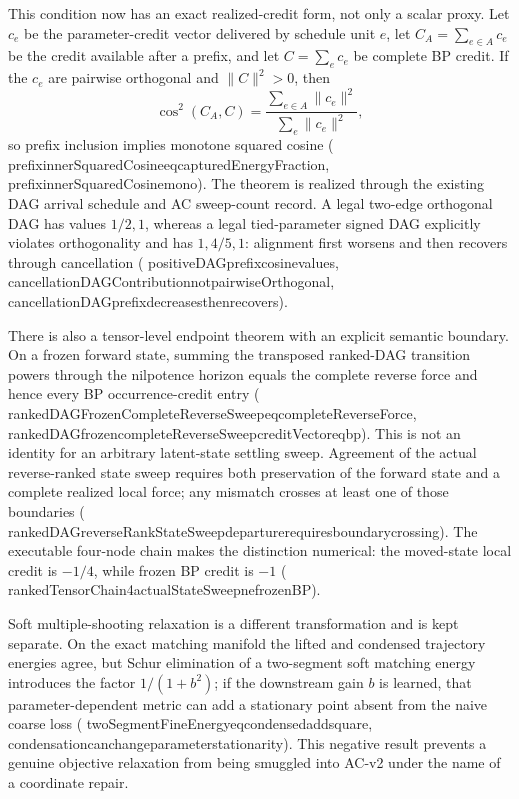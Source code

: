 \documentclass[11pt]{article}
\newcommand{\leanname}[1]{{\scriptsize\ttfamily
  \def\_{\textunderscore\allowbreak}#1}}
\begin{document}
This condition now has an exact realized-credit form, not only a scalar proxy.  Let
$c_e$ be the parameter-credit vector delivered by schedule unit $e$, let
$C_A=\sum_{e\in A}c_e$ be the credit available after a prefix, and let
$C=\sum_e c_e$ be complete BP credit.  If the $c_e$ are pairwise orthogonal and
$\lVert C\rVert^2>0$, then
\[
  \cos^2(C_A,C)=\frac{\sum_{e\in A}\lVert c_e\rVert^2}
                         {\sum_e\lVert c_e\rVert^2},
\]
so prefix inclusion implies monotone squared cosine
(\leanname{prefix\_innerSquaredCosine\_eq\_capturedEnergyFraction},
\leanname{prefix\_innerSquaredCosine\_mono}).  The theorem is realized through the
existing DAG arrival schedule and AC sweep-count record.  A legal two-edge orthogonal
DAG has values $1/2,1$, whereas a legal tied-parameter signed DAG explicitly violates
orthogonality and has $1,4/5,1$: alignment first worsens and then recovers through
cancellation
(\leanname{positiveDAG\_prefix\_cosine\_values},
\leanname{cancellationDAGContribution\_not\_pairwiseOrthogonal},
\leanname{cancellationDAG\_prefix\_decreases\_then\_recovers}).

There is also a tensor-level endpoint theorem with an explicit semantic boundary.  On
a frozen forward state, summing the transposed ranked-DAG transition powers through
the nilpotence horizon equals the complete reverse force and hence every BP
occurrence-credit entry
(\leanname{rankedDAGFrozenCompleteReverseSweep\_eq\_completeReverseForce},
\leanname{rankedDAG\_frozen\_completeReverseSweep\_creditVector\_eq\_bp}).  This is
not an identity for an arbitrary latent-state settling sweep.  Agreement of the actual
reverse-ranked state sweep requires both preservation of the forward state and a
complete realized local force; any mismatch crosses at least one of those boundaries
(\leanname{rankedDAG\_reverseRankStateSweep\_departure\_requires\_boundary\_crossing}).
The executable four-node chain makes the distinction numerical: the moved-state local
credit is $-1/4$, while frozen BP credit is $-1$
(\leanname{rankedTensorChain4\_actualStateSweep\_ne\_frozenBP}).

Soft multiple-shooting relaxation is a different transformation and is kept separate.
On the exact matching manifold the lifted and condensed trajectory energies agree, but
Schur elimination of a two-segment soft matching energy introduces the factor
$1/(1+b^2)$; if the downstream gain $b$ is learned, that parameter-dependent metric can
add a stationary point absent from the naive coarse loss
(\leanname{twoSegmentFineEnergy\_eq\_condensed\_add\_square},
\leanname{condensation\_can\_change\_parameter\_stationarity}). This negative result
prevents a genuine objective relaxation from being smuggled into AC-v2 under the name of
a coordinate repair.
\end{document}
